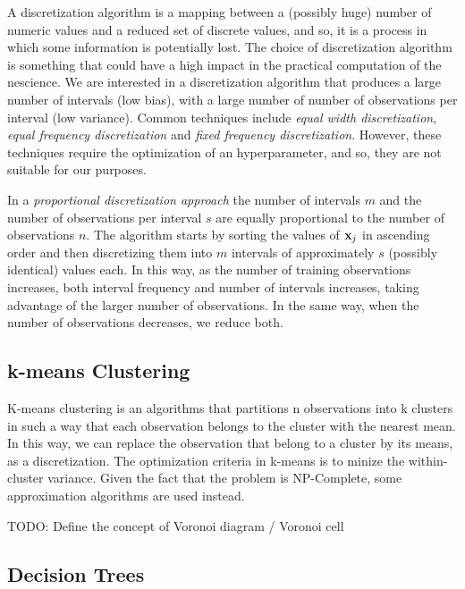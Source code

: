 A discretization algorithm is a mapping between a (possibly huge) number of numeric values and a reduced set of discrete values, and so, it is a process in which some information is potentially lost. The choice of discretization algorithm is something that could have a high impact in the practical computation of the nescience. We are interested in a discretization algorithm that produces a large number of intervals (low bias), with a large number of number of observations per interval (low variance). Common techniques include \emph{equal width discretization}, \emph{equal frequency discretization} and \emph{fixed frequency discretization}. However, these techniques require the optimization of an hyperparameter, and so, they are not suitable for our purposes.

In a \emph{proportional discretization approach} the number of intervals $m$ and the number of observations per interval $s$ are equally proportional to the number of observations $n$. The algorithm starts by sorting the values of $\bold{x}_j$ in ascending order and then discretizing them into $m$ intervals of approximately $s$ (possibly identical) values each. In this way, as the number of training observations increases, both interval frequency and number of intervals increases, taking advantage of the larger number of observations. In the same way, when the number of observations decreases, we reduce both.

\subsection{k-means Clustering}
\label{sec:kmeans_clustering}

K-means clustering is an algorithms that partitions n observations into k clusters in such a way that each observation belongs to the cluster with the nearest mean. In this way, we can replace the observation that belong to a cluster by its means, as a discretization. The optimization criteria in k-means is to minize the within-cluster variance. Given the fact that the problem is NP-Complete, some approximation algorithms are used instead.

{\color{red} TODO: Define the concept of Voronoi diagram / Voronoi cell}


\subsection{Decision Trees}
\label{subsec:learning_decision_trees}

